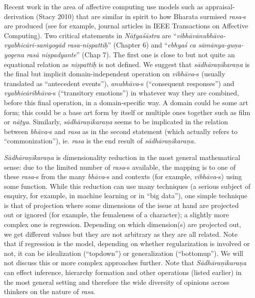 Recent work in the area of affective computing use models such as appraisal-derivation (Stacy 2010) that are similar in spirit to how Bharata surmised \textsl{rasa}-s are produced (see for example, journal articles in IEEE Transactions on Affective Computing). Two critical statements in \textsl{Nāṭyaśāstra} are “\textsl{vibhāvānubhāva-vyabhicāri-saṁyogād rasa-niṣpattiḥ}” (Chapter 6) and “\textsl{ebhyaś ca sāmānya-guṇa-yogena rasā niṣpadyante}” (Chap 7). The first one is close to but not quite an equational relation as \textsl{niṣpattiḥ} is not defined. We suggest that \textsl{sādhāraṇīkaraṇa} is the final but implicit domain-independent operation on \textsl{vibhāva}-s (usually translated as “antecedent events”), \textsl{anubhāva}-s (“consequent responses”) and \textsl{vyabhicāribhāva}-s (“transitory emotions”) in whatever way they are combined, before this final operation, in a domain-specific way. A domain could be some art form; this could be a base art form by itself or multiple ones together such as film or \textsl{nāṭya}. Similarly, \textsl{sādhāraṇīkaraṇa} seems to be implicated in the relation between \textsl{bhāva}-s and \textsl{rasa} as in the second statement (which actually refers to “commonization”), ie. \textsl{rasa} is the end result of \textsl{sādhāraṇīkaraṇa.}

\textsl{Sādhāraṇīkaraṇa} is dimensionality reduction in the most general mathematical sense: due to the limited number of \textsl{rasa}-s available, the mapping is to one of these \textsl{rasa}-s from the many \textsl{bhāva}-s and contexts (for example, \textsl{vibhāva}-s) using some function. While this reduction can use many techniques (a serious subject of enquiry, for example, in machine learning or in “big data”), one simple technique is that of projection where some dimensions of the issue at hand are projected out or ignored (for example, the femaleness of a character); a slightly more complex one is regression. Depending on which dimension(s) are projected out, we get different values but they are not arbitrary as they are all related. Note that if regression is the model, depending on whether regularization is involved or not, it can be idealization (“topdown”) or generalization (“bottomup”). We will not discuss this or more complex approaches further. Note that \textsl{Sādhāraṇīkaraṇa} can effect inference, hierarchy formation and other operations (listed earlier) in the most general setting and therefore the wide diversity of opinions across thinkers on the nature of \textsl{rasa}.

